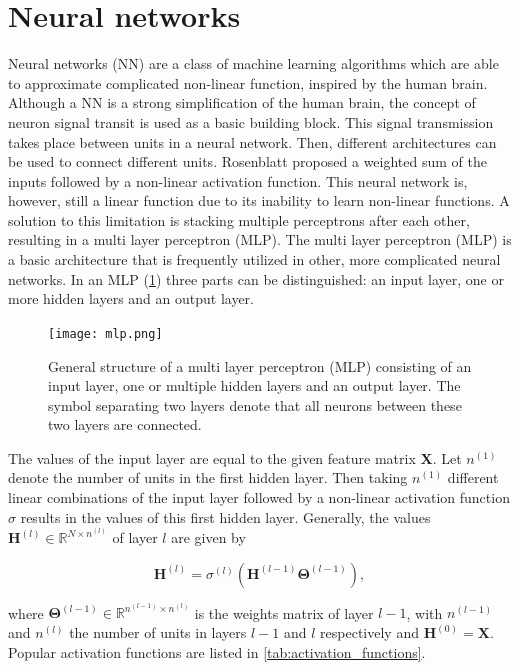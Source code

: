 \section{Neural networks}


Neural networks (NN) are a class of machine learning algorithms which are able to
approximate complicated non-linear function, inspired by the human brain.
\cite{cybenko1989approximation, rosenblatt1962principles} Although a NN is a strong
simplification of the human brain, the concept of neuron signal transit is used 
as a basic building block.\cite{wang2017origin} This signal transmission
takes place between units in a neural network. Then, different architectures
can be used to connect different units. Rosenblatt proposed a weighted sum 
of the inputs followed by a non-linear activation function.\cite{rosenblatt1962principles}
This neural network is, however, still a linear function due to its inability 
to learn non-linear functions. A solution to this limitation is stacking multiple 
perceptrons after each other, resulting in a multi layer perceptron (MLP).
The multi layer perceptron (MLP) is a basic architecture that is frequently 
utilized in other, more complicated neural networks.\cite{almeida2020multilayer}
In an MLP (\cref{fig:mlp_structure}) three parts can be distinguished: an input layer,
one or more hidden layers and an output layer.


\begin{figure}[h]
	\centering
	\texttt{[image: mlp.png]}
	\caption{General structure of a multi layer perceptron (MLP) consisting of an input layer,
		one or multiple hidden layers and an output layer. The symbol separating two layers denote that
		all neurons between these two layers are connected.}
	\label{fig:mlp_structure}
\end{figure}


The values of the input layer are equal to the given feature matrix
$\pmb{X}$. Let $n^{(1)}$ denote the number of units in the first hidden layer.
Then taking $n^{(1)}$ different linear combinations of the input layer followed by
a non-linear activation function $\sigma$ results in the values of this first hidden
layer. Generally, the values $\pmb{H}^{(l)} \in \mathbb{R}^{N \times n^{(l)}}$ of layer
$l$ are given by


\begin{equation}
	\pmb{H}^{(l)} =  \sigma^{(l)} \left(\pmb{H}^{(l-1)}\pmb{\Theta}^{(l-1)} \right),
\end{equation}


where $\pmb{\Theta}^{(l-1)} \in \mathbb{R}^{n^{(l-1)} \times n^{(l)}}$ is the weights matrix
of layer $l - 1$, with $n^{(l-1)}$ and $n^{(l)}$ the number of units in layers
$l-1$ and $l$ respectively and $\pmb{H}^{(0)} = \pmb{X}$. Popular activation
functions are listed in \cref{tab:activation_functions}.

